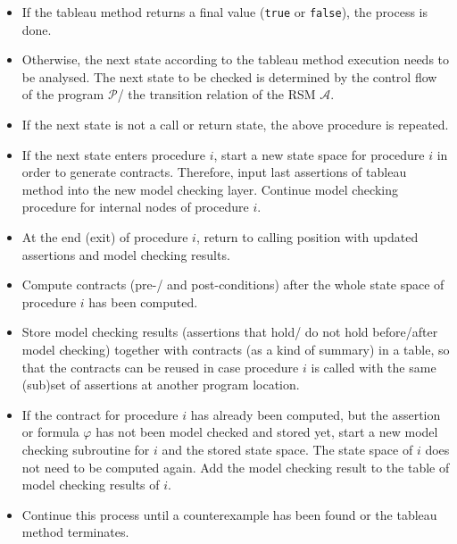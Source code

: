 \documentclass[a4paper,12pt]{article}
\begin{document}
\begin{itemize}
	\item If the tableau method returns a final value (\texttt{true} or \texttt{false}), the process is done.
	\item Otherwise, the next state according to the tableau method execution needs to be analysed. The next state to be checked is determined by the control flow of the program $\mathcal{P}$/ the transition relation of the RSM $\mathcal{A}$.
	\item If the next state is not a call or return state, the above procedure is repeated.
	\item If the next state enters procedure $i$, start a new state space for procedure $i$ in order to generate contracts. Therefore, input last assertions of tableau method into the new model checking layer. Continue model checking procedure for internal nodes of procedure $i$.
	\item At the end (exit) of procedure $i$, return to calling position with updated assertions and model checking results.
	\item Compute contracts (pre-/ and post-conditions) after the whole state space of procedure $i$ has been computed.
	\item Store model checking results (assertions that hold/ do not hold before/after model checking) together with contracts (as a kind of summary) in a table, so that the contracts can be reused in case procedure $i$ is called with the same (sub)set of assertions at another program location.
	\item If the contract for procedure $i$ has already been computed, but the assertion or formula $\varphi$ has not been model checked and stored yet, start a new model checking subroutine for $i$ and the stored state space. The state space of $i$ does not need to be computed again. Add the model checking result to the table of model checking results of $i$.
	\item Continue this process until a counterexample has been found or the tableau method terminates.
\end{itemize}
\end{document}
